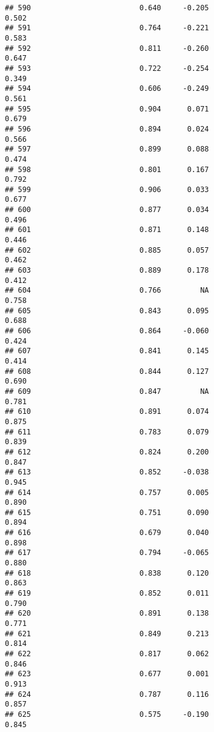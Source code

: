 \documentclass[
]{article}
\begin{document}
\begin{verbatim}
## 590                         0.640     -0.205                     0.502
## 591                         0.764     -0.221                     0.583
## 592                         0.811     -0.260                     0.647
## 593                         0.722     -0.254                     0.349
## 594                         0.606     -0.249                     0.561
## 595                         0.904      0.071                     0.679
## 596                         0.894      0.024                     0.566
## 597                         0.899      0.088                     0.474
## 598                         0.801      0.167                     0.792
## 599                         0.906      0.033                     0.677
## 600                         0.877      0.034                     0.496
## 601                         0.871      0.148                     0.446
## 602                         0.885      0.057                     0.462
## 603                         0.889      0.178                     0.412
## 604                         0.766         NA                     0.758
## 605                         0.843      0.095                     0.688
## 606                         0.864     -0.060                     0.424
## 607                         0.841      0.145                     0.414
## 608                         0.844      0.127                     0.690
## 609                         0.847         NA                     0.781
## 610                         0.891      0.074                     0.875
## 611                         0.783      0.079                     0.839
## 612                         0.824      0.200                     0.847
## 613                         0.852     -0.038                     0.945
## 614                         0.757      0.005                     0.890
## 615                         0.751      0.090                     0.894
## 616                         0.679      0.040                     0.898
## 617                         0.794     -0.065                     0.880
## 618                         0.838      0.120                     0.863
## 619                         0.852      0.011                     0.790
## 620                         0.891      0.138                     0.771
## 621                         0.849      0.213                     0.814
## 622                         0.817      0.062                     0.846
## 623                         0.677      0.001                     0.913
## 624                         0.787      0.116                     0.857
## 625                         0.575     -0.190                     0.845

\end{verbatim}
\end{document}
